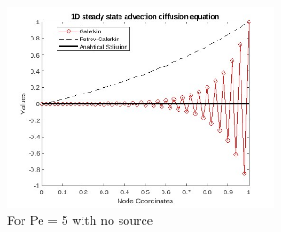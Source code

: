 \documentclass[12pt, oneside]{article}
\begin{document}
\begin{figure}[!h]
\centering
 \includegraphics[width=0.7\textwidth]{pe5_pg_no_source.jpg}
\caption{For Pe = 5 with no source}
 \label{pe5_no_source}
\end{figure}   
\end{document}
